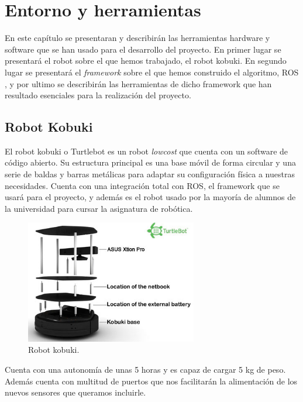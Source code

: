 \chapter{Entorno y herramientas}
\label{cap:entorno}
En este capítulo se presentaran y describirán las herramientas hardware y software que se han usado para el desarrollo del proyecto. En primer lugar se presentará el robot sobre el que hemos trabajado, el robot kobuki. En segundo lugar se presentará el \textit{framework} sobre el que hemos construido el algoritmo, ROS , y por ultimo se describirán las herramientas de dicho framework que han resultado esenciales para la realización del proyecto.


\section{Robot Kobuki}
\label{cap:robot}
El robot kobuki o Turtlebot es un robot \textit{lowcost} que cuenta con un software de código abierto. Su estructura principal es una base móvil de forma circular y una serie de baldas y barras metálicas para adaptar su configuración física a nuestras necesidades. Cuenta con una integración total con ROS, el framework que se usará para el proyecto, y además es el robot usado por la mayoría de alumnos de la universidad para cursar la asignatura de robótica.
\begin{figure} [H]
  \begin{center}
    \includegraphics[width=7.5cm]{img/cap3/kobuki}
  \end{center}
  \caption{Robot kobuki.}
  \label{fig:kobuki}
\end{figure}

Cuenta con una autonomía de unas 5 horas y es capaz de cargar 5 kg de peso. Además cuenta con multitud de puertos que nos facilitarán la alimentación de los nuevos sensores que queramos incluirle. 

